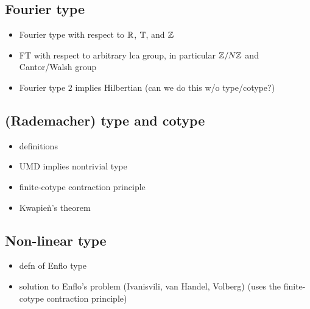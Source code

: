 \subsection{Fourier type}

\begin{itemize}
\item Fourier type with respect to $\mathbb{R}$, $\mathbb{T}$, and $\mathbb{Z}$
\item FT with respect to arbitrary lca group, in particular $\mathbb{Z}/N\mathbb{Z}$ and Cantor/Walsh group
\item Fourier type $2$ implies Hilbertian (can we do this w/o type/cotype?)
\end{itemize}

\subsection{(Rademacher) type and cotype}

\begin{itemize}
\item definitions
\item UMD implies nontrivial type
\item finite-cotype contraction principle
\item Kwapie\`n's theorem
\end{itemize}

\subsection{Non-linear type}

\begin{itemize}
\item defn of Enflo type
\item solution to Enflo's problem (Ivanisvili, van Handel, Volberg)   (uses the finite-cotype contraction principle)
\end{itemize}

